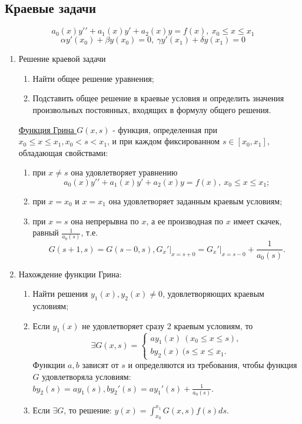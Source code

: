 \documentclass[a5paper,10pt]{article}
\begin{document}
		\subsection{Краевые задачи}
			$$ a_0(x)y\prime\prime + a_1(x)y\prime + a_2(x)y = f(x), \ x_0 \leq x \leq x_1 $$
			$$ \alpha y\prime(x_0) + \beta y(x_0) = 0, \ \gamma y\prime(x_1) + \delta y(x_1) = 0 $$
			\begin{enumerate}
				\item Решение краевой задачи
					\begin{enumerate}
						\item Найти общее решение уравнения;
						\item Подставить общее решение в краевые условия и определить значения произвольных постоянных, входящих в формулу общего решения.
					\end{enumerate}

				\begin{framed}
					\underline{Функция Грина $ G(x,s) $} - функция, определенная при $ x_0 \leq x \leq x_1, x_0 < s < x_1 $, и при каждом фиксированном $ s \in [x_0,x_1] $, обладающая свойствами:
					\begin{enumerate}
						\item при $ x \neq s $ она удовлетворяет уравнению
						$$ a_0(x)y\prime\prime + a_1(x)y\prime + a_2(x)y = f(x), \ x_0 \leq x \leq x_1; $$

						\item при $ x = x_0 $ и $ x = x_1 $ она удовлетворяет заданным краевым условиям;

						\item при $ x = s $ она непрерывна по $x$, а ее производная по $x$ имеет скачек, равный $ \frac{1}{a_0(s)} $, т.е.
						$$ G(s+1,s) = G(s-0,s), G_x\prime\bigg|_{x=s+0} = G_x\prime\bigg|_{x=s-0}+\frac{1}{a_0(s)}. $$
					\end{enumerate}
				\end{framed}

				\item Нахождение функции Грина:
					\begin{enumerate}
						\item Найти решения $ y_1(x), y_2(x) \neq 0 $, удовлетворяющих краевым условиям;
						\item Если $ y_1(x) $ не удовлетворяет сразу 2 краевым условиям, то
						\begin{equation*}
							\exists G(x,s) = 
							\begin{cases}
								ay_1(x) \ (x_0 \leq x \leq s),\\
								by_2(x) \ (s \leq x \leq x_1.
							\end{cases}
						\end{equation*}
						Функции $a,b$ зависят от $s$ и определяются из требования, чтобы функция $G$ удовлетворяла условиям: $ by_2(s) = ay_1(s), by_2\prime(s) = ay_1\prime(s) + \frac{1}{a_0(s)} $.
						\item Если $ \exists G $, то решение: $ y(x) = \int_{x_0}^{x_1} G(x,s)f(s)ds $.
					\end{enumerate}
			\end{enumerate}
\end{document}
